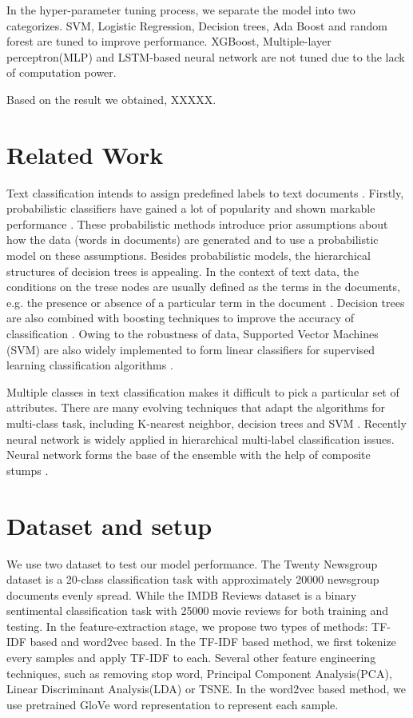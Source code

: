 \documentclass[11pt]{scrartcl}
\begin{document}
In the hyper-parameter tuning process, we separate the model into two categorizes. SVM, Logistic Regression, Decision trees, Ada Boost and random forest are tuned to improve performance. XGBoost, Multiple-layer perceptron(MLP) and LSTM-based neural network are not tuned due to the lack of computation power.

Based on the result we obtained, XXXXX.


\section{Related Work}
Text classification intends to assign predefined labels to text documents \cite{allahyari2017brief,thangaraj2018text}. Firstly, probabilistic classifiers have gained a lot of popularity and shown markable performance \cite{chakrabarti1997using,joachims1996probabilistic,koller1997hierarchically,larkey1996combining}. These probabilistic methods introduce prior assumptions about how the data (words in documents) are generated and to use a probabilistic model on these assumptions. Besides probabilistic models, the hierarchical structures of decision trees is appealing. In the context of text data, the conditions on the trese nodes are usually defined as the terms in the documents, e.g. the presence or absence of a particular term in the document \cite{breiman1984classification,duda2012pattern}. Decision trees are also combined with boosting techniques to improve the accuracy of classification \cite{freund1995desicion,schapire2000boostexter}. Owing to the robustness of data, Supported Vector Machines (SVM) are also widely implemented to form linear classifiers for supervised learning classification algorithms \cite{joachims1998text,joachims2001statistical}.

Multiple classes in text classification makes it difficult to pick a particular set of attributes. There are many evolving techniques that adapt the algorithms for multi-class task, including K-nearest neighbor, decision trees and SVM \cite{tang2016multi,yi2011multi}. Recently neural network is widely applied in hierarchical multi-label classification issues. Neural network forms the base of the ensemble with the help of composite stumps \cite{nie2015neural,cerri2014hierarchical}.


\section{Dataset and setup}
We use two dataset to test our model performance. The Twenty Newsgroup dataset is a 20-class classification task with approximately 20000 newsgroup documents evenly spread\cite{Lang95}. While the IMDB Reviews dataset is a binary sentimental classification task with 25000 movie reviews for both training and testing\cite{maas-EtAl:2011:ACL-HLT2011}. In the feature-extraction stage, we propose two types of methods: TF-IDF based and word2vec based. In the TF-IDF based method, we first tokenize every samples and apply TF-IDF to each. Several other feature engineering techniques, such as removing stop word, Principal Component Analysis(PCA), Linear Discriminant Analysis(LDA) or TSNE. In the word2vec based method, we use pretrained GloVe\cite{pennington2014glove} word representation to represent each sample.
\end{document}
